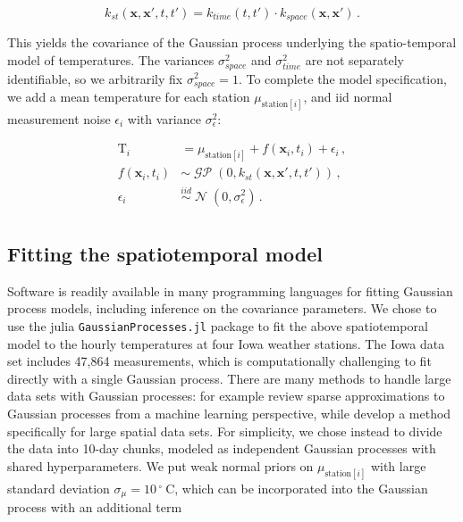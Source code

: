 \documentclass[letter]{article}
\newcommand{\genericdel}[3]{%
      \left#1#3\right#2
    }
\newcommand{\del}[1]{\genericdel(){#1}}
\newcommand{\sbr}[1]{\genericdel[]{#1}}
\DeclareMathOperator{\normal}{\mathcal{N}}
\DeclareMathOperator{\GP}{\mathcal{GP}}
\newcommand{\T}{\mathrm{T}}
\newcommand{\station}[1]{\mathrm{station}\sbr{#1}}
\newcommand{\xvec}{\mathbold{x}}
\newcommand{\iid}{iid}
\newcommand{\sigman}{\sigma_{\epsilon}}
\newcommand{\degreeC}{{}^{\circ}~\mathrm{C}}
\newcommand{\eqlabel}[1]{\label{#1}}
\renewcommand{\cite}[1]{\citep{#1}}
\begin{document}
\begin{equation}
k_{st}(\xvec,\xvec',t,t') = k_{time}(t,t') \cdot k_{space}(\xvec, \xvec')\,.
\end{equation}

This yields the covariance of the Gaussian process underlying the spatio-temporal model of temperatures.
The variances \(\sigma_{space}^2\) and \(\sigma_{time}^2\) are not separately identifiable, so we arbitrarily fix \(\sigma_{space}^2=1\).
To complete the model specification, we add a mean temperature for each station \(\mu_{\station{i}}\), and iid normal measurement noise \(\epsilon_i\) with variance \(\sigman^2\):

\begin{equation}
\begin{split}
    \T_i &= \mu_{\station{i}} + f(\xvec_i, t_i) + \epsilon_i\,,\\
    f(\xvec_i, t_i) &\sim \GP\del{0, k_{st}(\xvec,\xvec',t,t')}\,,\\
    \epsilon_i &\overset{\iid}{\sim} \normal\del{0,\sigman^2}\,.\\
\end{split}
\eqlabel{eq:gpmodel}
\end{equation}
    


        \subsection{Fitting the spatiotemporal model}\label{fitting-the-spatiotemporal-model}

Software is readily available in many programming languages for fitting Gaussian process models, including inference on the covariance parameters. We chose to use the julia \texttt{GaussianProcesses.jl} package to fit the above spatiotemporal model to the hourly temperatures at four Iowa weather stations.
The Iowa data set includes 47,864 measurements, which is computationally challenging to fit directly with a single Gaussian process.
There are many methods to handle large data sets with Gaussian processes: for example \cite{quinonero2007approximation} review sparse approximations to Gaussian processes from a machine learning perspective, while \cite{banerjee2008gaussian} develop a method specifically for large spatial data sets.
For simplicity, we chose instead to divide the data into 10-day chunks, modeled as independent Gaussian processes with shared hyperparameters.
We put weak normal priors on \(\mu_{\station{i}}\) with large standard deviation \(\sigma_{\mu}=10\,\degreeC\), which can be incorporated into the Gaussian process with an additional term
\end{document}
